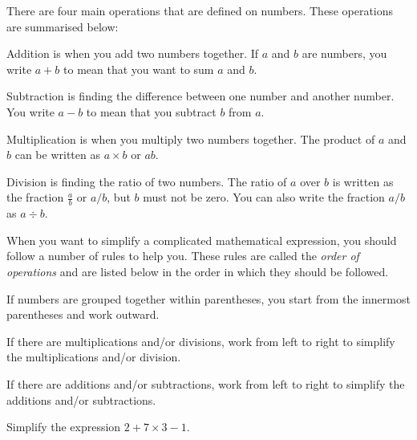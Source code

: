 \documentclass[a4paper,oneside,12pt]{article}
\begin{document}
There are four main operations that are defined on numbers.  These
operations are summarised below:
\begin{packedenumeral}
\item Addition is when you add two numbers together.  If $a$ and $b$
  are numbers, you write $a + b$ to mean that you want to sum $a$ and
  $b$.

\item Subtraction is finding the difference between one number and
  another number.  You write $a - b$ to mean that you subtract $b$
  from $a$.

\item Multiplication is when you multiply two numbers together.  The
  product of $a$ and $b$ can be written as $a \times b$ or $ab$.

\item Division is finding the ratio of two numbers.  The ratio of $a$
  over $b$ is written as the fraction $\frac{a}{b}$ or $a/b$, but $b$
  must not be zero.  You can also write the fraction $a/b$ as
  $a \div b$.
\end{packedenumeral}

When you want to simplify a complicated mathematical expression, you
should follow a number of rules to help you.  These rules are called
the \emph{order of operations} and are listed below in the order in
which they should be followed.
\begin{packedenumeral}
\item If numbers are grouped together within parentheses, you start
  from the innermost parentheses and work outward.

\item If there are multiplications and/or divisions, work from left to
  right to simplify the multiplications and/or division.

\item If there are additions and/or subtractions, work from left to
  right to simplify the additions and/or subtractions.
\end{packedenumeral}

\begin{exercise}
Simplify the expression $2 + 7 \times 3 - 1$.
\end{exercise}

\end{document}
